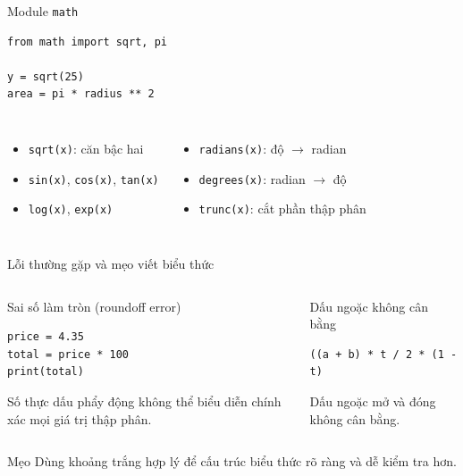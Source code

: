 \documentclass[aspectratio=169,10pt]{beamer}
\begin{document}
\begin{frame}[fragile]{Module \texttt{math}}
\begin{lstlisting}
from math import sqrt, pi

y = sqrt(25)
area = pi * radius ** 2
\end{lstlisting}
\begin{columns}[T,onlytextwidth]
\begin{itemize}
  \item \texttt{sqrt(x)}: căn bậc hai
  \item \texttt{sin(x)}, \texttt{cos(x)}, \texttt{tan(x)}
  \item \texttt{log(x)}, \texttt{exp(x)}
\end{itemize}
\begin{itemize}
  \item \texttt{radians(x)}: độ $\rightarrow$ radian
  \item \texttt{degrees(x)}: radian $\rightarrow$ độ
  \item \texttt{trunc(x)}: cắt phần thập phân
\end{itemize}
\end{columns}
\end{frame}


\begin{frame}[fragile]{Lỗi thường gặp và mẹo viết biểu thức}
\small
\begin{columns}[T,totalwidth=0.94\textwidth]
\begin{alertblock}{Sai số làm tròn (roundoff error)}
\begin{lstlisting}[basicstyle=\ttfamily\scriptsize]
price = 4.35
total = price * 100
print(total)
\end{lstlisting}
Số thực dấu phẩy động không thể biểu diễn chính xác mọi giá trị thập phân.
\end{alertblock}
\hfill
{}
\begin{alertblock}{Dấu ngoặc không cân bằng}
\begin{lstlisting}[basicstyle=\ttfamily\scriptsize]
((a + b) * t / 2 * (1 - t)
\end{lstlisting}
Dấu ngoặc mở và đóng không cân bằng.
\end{alertblock}
\end{columns}
\vspace{0.35cm}
\begin{block}{Mẹo}
Dùng khoảng trắng hợp lý để cấu trúc biểu thức rõ ràng và dễ kiểm tra hơn.
\end{block}
\end{frame}
\end{document}
